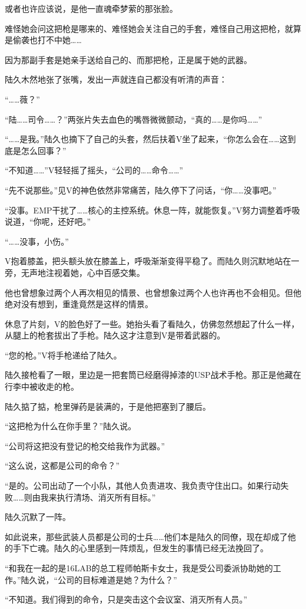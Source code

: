 或者也许应该说，是他一直魂牵梦萦的那张脸。

难怪她会问这把枪是哪来的、难怪她会关注自己的手套，难怪自己用这把枪，就算是偷袭也打不中她……

因为那副手套是她亲手送给自己的、而那把枪，正是属于她的武器。

陆久木然地张了张嘴，发出一声就连自己都没有听清的声音：

“……薇？”

“陆……司令……？”两张片失去血色的嘴唇微微颤动，“真的……是你吗……”

“……是我。”陆久也摘下了自己的头套，然后扶着V坐了起来，“你怎么会在……这到底是怎么回事？”

“不知道……”V轻轻摇了摇头，“公司的……命令……”

“先不说那些。”见V的神色依然非常痛苦，陆久停下了问话，“你……没事吧。”

“没事。EMP干扰了……核心的主控系统。休息一阵，就能恢复。”V努力调整着呼吸说道，“你呢，还好吧。”

“……没事，小伤。”

V抱着膝盖，把头额头放在膝盖上，呼吸渐渐变得平稳了。而陆久则沉默地站在一旁，无声地注视着她，心中百感交集。

他也曾想象过两个人再次相见的情景、也曾想象过两个人也许再也不会相见。但他绝对没有想到，重逢竟然是这样的情景。

休息了片刻，V的脸色好了一些。她抬头看了看陆久，仿佛忽然想起了什么一样，从腿上的枪套拔出了手枪。陆久这才注意到V是带着武器的。

“您的枪。”V将手枪递给了陆久。

陆久接枪看了一眼，里边是一把套筒已经磨得掉漆的USP战术手枪。那正是他藏在行李中被收走的枪。

陆久掂了掂，枪里弹药是装满的，于是他把塞到了腰后。

“这把枪为什么在你手里？”陆久说。

“公司将这把没有登记的枪交给我作为武器。”

“这么说，这都是公司的命令？”

“是的。公司出动了一个小队，其他人负责进攻、我负责守住出口。如果行动失败……则由我来执行清场、消灭所有目标。”

陆久沉默了一阵。

如此说来，那些武装人员都是公司的士兵……他们本是陆久的同僚，现在却成了他的手下亡魂。陆久的心里感到一阵烦乱，但发生的事情已经无法挽回了。

“和我在一起的是16LAB的总工程师帕斯卡女士，我是受公司委派协助她的工作。”陆久说，“公司的目标难道是她？为什么？”

“不知道。我们得到的命令，只是突击这个会议室、消灭所有人员。”

